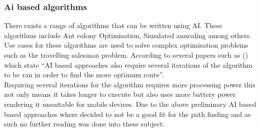 \subsubsection{Ai based algorithms}
There exists a range of algorithms that can be written using AI. These algorithms include Ant colony Optimisation, Simulated annealing among others. Use cases for these algorithms are used to solve complex optimisation problems such as the travelling salesman problem. According to several papers such as (\citetemp \citetemp) which state “AI based approaches also require several iterations of the algorithm to be ran in order to find the more optimum route”.\\
Requiring several iterations for the algorithm requires more processing power this not only means it takes longer to execute but also uses more battery power rendering it unsuitable for mobile devices. Due to the above preliminary AI based based approaches where decided to not be a good fit for the path finding and as such no further reading was done into these subject. 